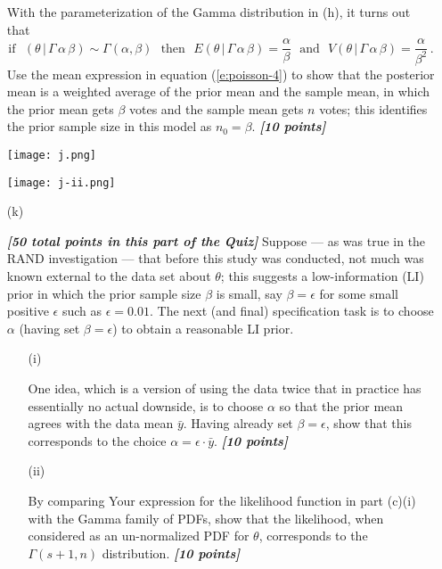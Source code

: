 \documentclass[12pt]{article}
\newcommand{\given}{\, | \,}
\newcommand{\bi}[1]{\b{\i{#1}}}
\renewcommand{\b}[1]{\textbf{#1}}
\renewcommand{\i}[1]{\textit{#1}}
\begin{document}
\begin{itemize}
With the parameterization of the Gamma distribution in (h), it turns out that
\begin{equation} \label{e:poisson-4}
\textrm{if} \ \ \ ( \theta \given \Gamma \, \alpha \, \beta ) \sim \Gamma ( \alpha, \beta ) \ \ \ \textrm{then} \ \ \ E ( \theta \given \Gamma \, \alpha \, \beta ) = \frac{ \alpha }{ \beta } \ \ \ \textrm{and} \ \ \ V ( \theta \given \Gamma \, \alpha \, \beta ) = \frac{ \alpha }{ \beta^2 } \, .
\end{equation}
Use the mean expression in equation (\ref{e:poisson-4}) to show that the posterior mean is a weighted average of the prior mean and the sample mean, in which the prior mean gets $\beta$ votes and the sample mean gets $n$ votes; this identifies the prior sample size in this model as $n_0 = \beta$. \bi{[10 points]}


    \centering
    \texttt{[image: j.png]}


    \centering
    \texttt{[image: j-ii.png]}

\item[(k)]

\bi{[50 total points in this part of the Quiz]} Suppose --- as was true in the RAND investigation --- that before this study was conducted, not much was known external to
the data set about $\theta$; this suggests a low-information (LI) prior in which the prior sample size $\beta$ is small, say $\beta = \epsilon$ for some small positive $\epsilon$ such as $\epsilon = 0.01$. The next (and final) specification task is to choose $\alpha$ (having set $\beta = \epsilon$) to obtain a reasonable LI prior. 

\begin{itemize}

\item[(i)]

One idea, which is a version of using the data twice that in practice has essentially no actual downside, is to choose $\alpha$ so that the prior mean agrees with the data mean $\bar{ y }$. Having already set $\beta = \epsilon$, show that this corresponds to the choice $\alpha = \epsilon \cdot \bar{ y }$. \bi{[10 points]}

\item[(ii)]

By comparing Your expression for the likelihood function in part (c)(i) with the Gamma family of PDFs, show that the likelihood, when considered as an un-normalized PDF for $\theta$, corresponds to the $\Gamma ( s + 1, n )$ distribution. \bi{[10 points]}


\end{itemize}
\end{itemize}
\end{document}
